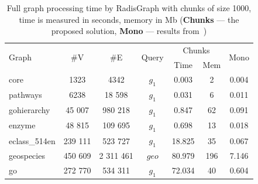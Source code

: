 {\setlength{\tabcolsep}{0.25em}
\begin{table}
{
\caption{Full graph processing time by RadisGraph with chunks of size 1000, time is measured in seconds, memory in Mb (\textbf{Chunks} --- the proposed solution, \textbf{Mono} --- results from~\cite{10.1145/3398682.3399163})}
\label{tbl:redis_full_graph_processing}
\small
{}
\begin{tabular}{|l|c|c|c|c|c|c|}
\hline
\multirow{2}{*}{Graph} & \multirow{2}{*}{\#V} & \multirow{2}{*}{\#E} & \multirow{2}{*}{Query} & \multicolumn{2}{c|}{Chunks}  &  \multirow{2}{*}{Mono}  \\
                       &                      &                      &                        & Time   & Mem & \\
\hline
\hline
core                   & 1323                 & 4342                 & $g_1$                  & 0.003  & 2                  &  0.004 \\ 
pathways               & 6238                 & 18 598               & $g_1$                  & 0.031  & 6                  &  0.011 \\ 
gohierarchy            & 45 007               & 980 218              & $g_1$                  & 0.847  & 62                  &  0.091 \\ 
enzyme                 & 48 815               & 109 695              & $g_1$                  & 0.698  & 13                  &  0.018 \\ 
eclass\_514en          & 239 111              & 523 727              & $g_1$                  & 18.825 & 35                   &  0.067 \\ 
geospecies             & 450 609              & 2 311 461            & $geo$                  & 80.979 & 196                  &  7.146 \\
go                     & 272 770              & 534 311              & $g_1$                  & 72.034 & 40                  &  0.604 \\ 
\hline
\end{tabular}
}
\end{table}
}

